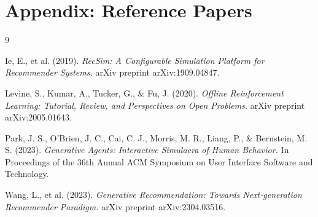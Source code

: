 \documentclass[]{../0_aga-homework}
\begin{document}
\section*{Appendix: Reference Papers}
\begin{thebibliography}{9}

Ie, E., et al. (2019). 
\textit{RecSim: A Configurable Simulation Platform for Recommender Systems.} 
arXiv preprint arXiv:1909.04847.

Levine, S., Kumar, A., Tucker, G., \& Fu, J. (2020). 
\textit{Offline Reinforcement Learning: Tutorial, Review, and Perspectives on Open Problems.} 
arXiv preprint arXiv:2005.01643.

Park, J. S., O'Brien, J. C., Cai, C. J., Morris, M. R., Liang, P., \& Bernstein, M. S. (2023). 
\textit{Generative Agents: Interactive Simulacra of Human Behavior.} 
In Proceedings of the 36th Annual ACM Symposium on User Interface Software and Technology.

Wang, L., et al. (2023). 
\textit{Generative Recommendation: Towards Next-generation Recommender Paradigm.} 
arXiv preprint arXiv:2304.03516.

\end{thebibliography}
\end{document}

